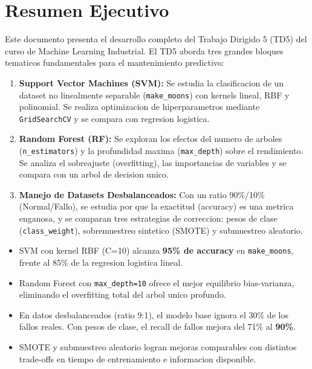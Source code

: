 \documentclass[12pt,a4paper]{article}
\begin{document}
\tableofcontents
\newpage

\section*{Resumen Ejecutivo}

Este documento presenta el desarrollo completo del Trabajo Dirigido 5 (TD5) del curso de Machine Learning Industrial. El TD5 aborda tres grandes bloques tematicos fundamentales para el mantenimiento predictivo:

\begin{enumerate}[label=\textbf{\arabic*.}]
  \item \textbf{Support Vector Machines (SVM):} Se estudia la clasificacion de un dataset no linealmente separable (\texttt{make\_moons}) con kernels lineal, RBF y polinomial. Se realiza optimizacion de hiperparametros mediante \texttt{GridSearchCV} y se compara con regresion logistica.

  \item \textbf{Random Forest (RF):} Se exploran los efectos del numero de arboles (\texttt{n\_estimators}) y la profundidad maxima (\texttt{max\_depth}) sobre el rendimiento. Se analiza el sobreajuste (overfitting), las importancias de variables y se compara con un arbol de decision unico.

  \item \textbf{Manejo de Datasets Desbalanceados:} Con un ratio 90\%/10\% (Normal/Fallo), se estudia por que la exactitud (accuracy) es una metrica enganosa, y se comparan tres estrategias de correccion: pesos de clase (\texttt{class\_weight}), sobremuestreo sintetico (SMOTE) y submuestreo aleatorio.
\end{enumerate}

\begin{tcolorbox}[resultbox, title={Resultados Destacados}]
  \begin{itemize}[leftmargin=1.5em]
    \item SVM con kernel RBF (C=10) alcanza \textbf{95\% de accuracy} en \texttt{make\_moons}, frente al 85\% de la regresion logistica lineal.
    \item Random Forest con \texttt{max\_depth=10} ofrece el mejor equilibrio bias-varianza, eliminando el overfitting total del arbol unico profundo.
    \item En datos desbalanceados (ratio 9:1), el modelo base ignora el 30\% de los fallos reales. Con pesos de clase, el recall de fallos mejora del 71\% al \textbf{90\%}.
    \item SMOTE y submuestreo aleatorio logran mejoras comparables con distintos trade-offs en tiempo de entrenamiento e informacion disponible.
  \end{itemize}
\end{tcolorbox}
\end{document}
